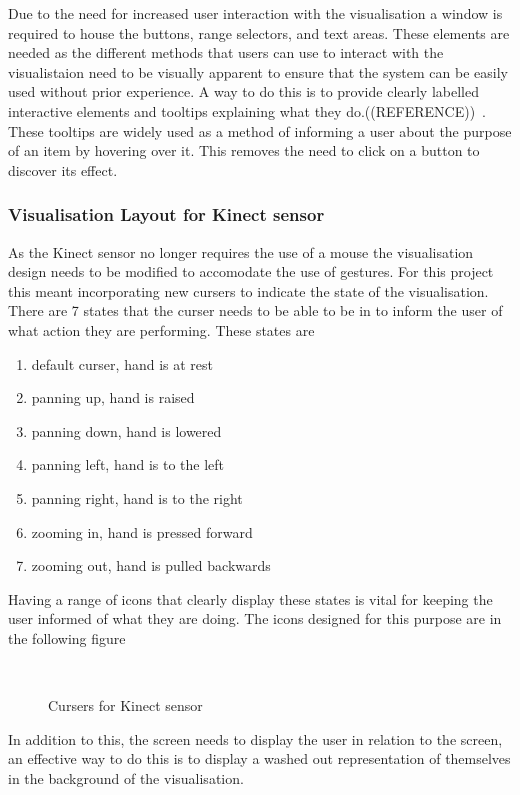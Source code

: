 Due to the need for increased user interaction with the visualisation a window
is required to house the buttons, range selectors, and text areas. These
elements are needed as the different methods that users can use to interact with
the visualistaion need to be visually apparent to ensure that the system can be
easily used without prior experience. A way to do this is to provide clearly
labelled interactive elements and tooltips explaining what they
do.((REFERENCE))~. These tooltips are widely used as a method of informing a
user about the purpose of an item by hovering over it. This removes the need to
click on a button to discover its effect.

\subsubsection{Visualisation Layout for Kinect sensor}
As the Kinect sensor no longer requires the use of a mouse the visualisation
design needs to be modified to accomodate the use of gestures. For this project
this meant incorporating new cursers to indicate the state of the visualisation.
There are 7 states that the curser needs to be able to be in to inform the user
of what action they are performing. These states are

\begin{enumerate}
 \item default curser, hand is at rest
 \item panning up, hand is raised
 \item panning down, hand is lowered
 \item panning left, hand is to the left
 \item panning right, hand is to the right
 \item zooming in, hand is pressed forward
 \item zooming out, hand is pulled backwards
\end{enumerate}

Having a range of icons that clearly display these states is vital for keeping
the user informed of what they are doing. The icons designed for this purpose
are in the following figure

\begin{figure}[h!]
  \centering
  ~
  \caption{Cursers for Kinect sensor}  
\end{figure}

In addition to this, the screen needs to display the user in relation to the
screen, an effective way to do this is to display a washed out representation of
themselves in the background of the visualisation.

